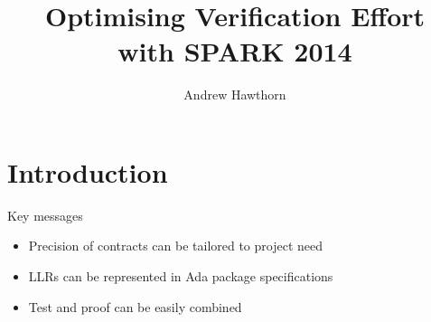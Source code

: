 \documentclass{beamer}
\title{Optimising Verification Effort\\with SPARK 2014}
\author{Andrew Hawthorn}
\begin{document}
\begin{altrantitle}
\end{altrantitle}


\makeatletter
\newenvironment{btHighlight}[1][]
{\begingroup\tikzset{bt@Highlight@par/.style={#1}}\begin{lrbox}{\@tempboxa}}
{\end{lrbox}\bt@HL@box[bt@Highlight@par]{\@tempboxa}\endgroup}

\newcommand\btHL[1][]{%
  \begin{btHighlight}[#1]\bgroup\aftergroup\bt@HL@endenv%
}
\def\bt@HL@endenv{%
  \end{btHighlight}%
  \egroup
}
\newcommand{\bt@HL@box}[2][]{%
  \tikz[remember picture]{%
    \pgfpathrectangle{\pgfpoint{1pt}{0pt}}{\pgfpoint{\wd #2}{\ht #2}}%
    \pgfusepath{use as bounding box}%
    \node[anchor=base west,%
          outer sep=0pt,%
          inner xsep=1pt,%
          inner ysep=0pt,%
          rounded corners=2pt,%
          minimum height=\ht\strutbox+1pt,%
          #1]%
          {%
            \raisebox{1pt}{\strut}\strut\usebox{#2}%
          };%
  }%
}
\makeatother

\section{Introduction}

\begin{frame}[fragile]{Key messages}
  \begin{itemize}
  \item Precision of contracts can be tailored to project need
  \item LLRs can be represented in Ada package specifications
  \item Test and proof can be easily combined

  \end{itemize}
\end{frame}
\end{document}
